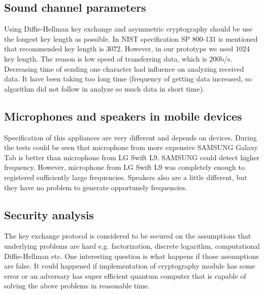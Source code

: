 \documentclass[11pt,titlepage]{article}
\theoremstyle{plain}
\begin{document}
\subsection{Sound channel parameters}

Using Diffie-Hellman key exchange and asymmetric cryptography should be use the longest key length as possible. In NIST specification SP 800-131 is mentioned that recommended key length is 3072. However, in our prototype we used 1024 key length. The reason is low speed of transferring data, which is 200b/s. Decreasing time of sending one character had influence on analyzing received data. It have been taking too long time (frequency of getting data increased, so algorithm did not follow in analyze so much data in short time).

\vspace{5mm}



\subsection{Microphones and speakers in mobile devices}
Specification of this appliances are very different and depends on devices. During the tests could be seen that microphone from more expensive SAMSUNG Galaxy Tab is better than microphone from LG Swift L9. SAMSUNG could detect higher frequency. However, microphone from LG Swift L9 was completely enough to registered sufficiently large frequencies. Speakers also are a little different, but they have no problem to generate opportunely frequencies.



\subsection{Security analysis}
The key exchange protocol is considered to be secured on the assumptions that underlying problems are hard e.g. factorization, discrete logarithm, computational Diffie-Hellman etc. One interesting question is what happens if those assumptions are false. It could happened if implementation of cryptography module has some error or an adversary has super efficient quantum computer that is capable of solving the above problems in reasonable time.

\vspace{5mm}
\end{document}
